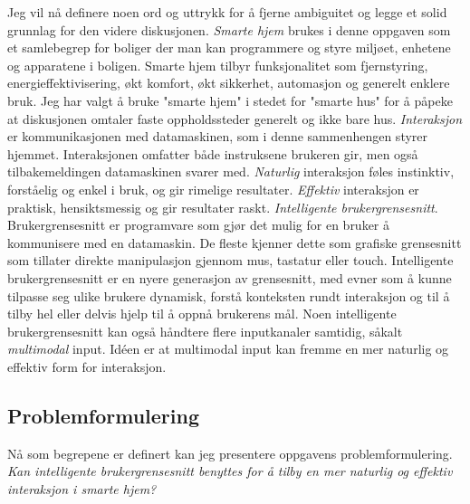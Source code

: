 Jeg vil nå definere noen ord og uttrykk for å fjerne ambiguitet og legge et solid grunnlag for den videre diskusjonen.
\newline\newline
\emph{Smarte hjem} brukes i denne oppgaven som et samlebegrep for boliger der man kan programmere og styre miljøet, enhetene og apparatene i boligen. Smarte hjem tilbyr funksjonalitet som fjernstyring, energieffektivisering, økt komfort, økt sikkerhet, automasjon og generelt enklere bruk. Jeg har valgt å bruke "smarte hjem" i stedet for "smarte hus" for å påpeke at diskusjonen omtaler faste oppholdssteder generelt og ikke bare hus. 
\newline\newline
\emph{Interaksjon} er kommunikasjonen med datamaskinen, som i denne sammenhengen styrer hjemmet. Interaksjonen omfatter både instruksene brukeren gir, men også tilbakemeldingen datamaskinen svarer med.
\newline\newline
\emph{Naturlig} interaksjon føles instinktiv, forståelig og enkel i bruk, og gir rimelige resultater.
\newline\newline
\emph{Effektiv} interaksjon er praktisk, hensiktsmessig og gir resultater raskt.
\newline\newline
\emph{Intelligente brukergrensesnitt}. Brukergrensesnitt er programvare som gjør det mulig for en bruker å kommunisere med en datamaskin. De fleste kjenner dette som grafiske grensesnitt som tillater direkte manipulasjon gjennom mus, tastatur eller touch. Intelligente brukergrensesnitt er en nyere generasjon av grensesnitt, med evner som å kunne tilpasse seg ulike brukere dynamisk, forstå konteksten rundt interaksjon og til å tilby hel eller delvis hjelp til å oppnå brukerens mål. Noen intelligente brukergrensesnitt kan også håndtere flere inputkanaler samtidig, såkalt \emph{multimodal} input. Idéen er at multimodal input kan fremme en mer naturlig og effektiv form for interaksjon.

\subsection*{Problemformulering}
Nå som begrepene er definert kan jeg presentere oppgavens problemformulering.
\newline\newline
\emph{Kan intelligente brukergrensesnitt benyttes for å tilby en mer naturlig og effektiv interaksjon i smarte hjem?}

